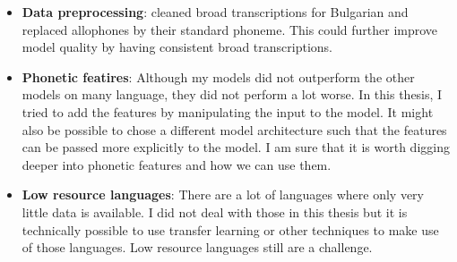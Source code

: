 \begin{itemize}
\item \textbf{Data preprocessing}: \cite{Ashby-Bartley.2021} cleaned broad transcriptions for Bulgarian and replaced allophones by their standard phoneme. This could further improve model quality by having consistent broad transcriptions.
\item \textbf{Phonetic featires}: Although my models did not outperform the other models on many language, they did not perform a lot worse. In this thesis, I tried to add the features by manipulating the input to the model. It might also be possible to chose a different model architecture such that the features can be passed more explicitly to the model. I am sure that it is worth digging deeper into phonetic features and how we can use them.
\item \textbf{Low resource languages}: There are a lot of languages where only very little data is available. I did not deal with those in this thesis but it is technically possible to use transfer learning or other techniques to make use of those languages. Low resource languages still are a challenge.
\end{itemize}